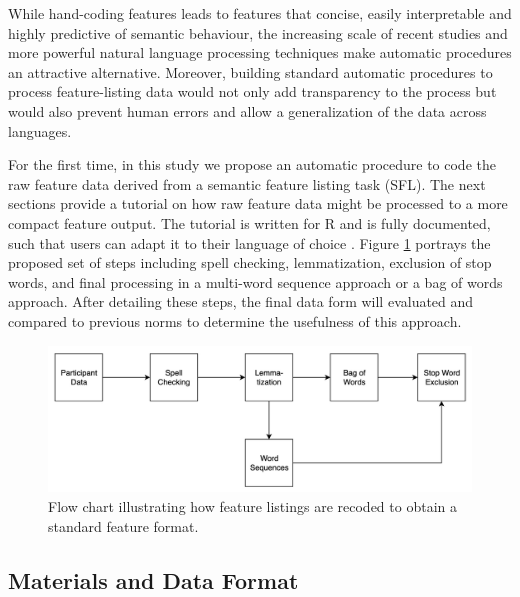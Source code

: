 \documentclass[man]{apa6}
\begin{document}
While hand-coding features leads to features that concise, easily interpretable and highly predictive of semantic behaviour, the increasing scale of recent studies and more powerful natural language processing techniques make automatic procedures an attractive alternative. Moreover, building standard automatic procedures to process feature-listing data would not only add transparency to the process but would also prevent human errors and allow a generalization of the data across languages.

For the first time, in this study we propose an automatic procedure to code the raw feature data derived from a semantic feature listing task (SFL). The next sections provide a tutorial on how raw feature data might be processed to a more compact feature output. The tutorial is written for R and is fully documented, such that users can adapt it to their language of choice . Figure \ref{fig:flowchart} portrays the proposed set of steps including spell checking, lemmatization, exclusion of stop words, and final processing in a multi-word sequence approach or a bag of words approach. After detailing these steps, the final data form will evaluated and compared to previous norms to determine the usefulness of this approach.

\begin{figure}
\includegraphics[width=5.28in]{flow_chart} \caption{Flow chart illustrating how feature listings are recoded to obtain a standard feature format.}\label{fig:flowchart}
\end{figure}

\hypertarget{materials-and-data-format}{%
\subsection{Materials and Data Format}\label{materials-and-data-format}}
\end{document}
